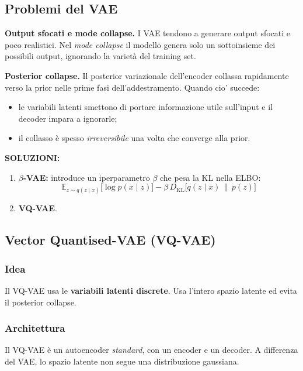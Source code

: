 \documentclass[11pt,a4paper]{article}
\providecommand{\E}{\mathbb{E}}
\providecommand{\DKL}{D_{\mathrm{KL}}}
\begin{document}
\subsection{Problemi del VAE}

\textbf{Output sfocati e mode collapse.} I VAE tendono a generare output sfocati e poco realistici. Nel 
\emph{mode collapse} il modello genera solo un sottoinsieme dei possibili output, 
ignorando la varietà del training set. 

\textbf{Posterior collapse.} Il posterior variazionale dell'encoder collassa rapidamente verso la prior nelle 
prime fasi dell'addestramento. Quando cio' succede:
\begin{itemize}
  \item le variabili latenti smettono di portare informazione utile sull'input e il decoder impara a ignorarle;
  \item il collasso è spesso \textit{irreversibile} una volta che converge alla prior.
\end{itemize}

\textbf{SOLUZIONI:}
\begin{enumerate}
  \item \textbf{$\beta$-VAE:} introduce un iperparametro $\beta$ che pesa la KL nella ELBO:
  \[
  \boxed{\E_{z \sim q(z \mid x)}\big[\log p(x \mid z)\big] - \beta\, \DKL\big[q(z \mid x) \,\|\, p(z)\big]}
  \]
  \item \textbf{VQ-VAE}.
\end{enumerate}

\subsection{Vector Quantised-VAE (VQ-VAE)}

\subsubsection{Idea}

Il VQ-VAE usa le \textbf{variabili latenti discrete}. 
Usa l'intero spazio latente ed evita il posterior collapse.

\subsubsection{Architettura}

Il VQ-VAE è un autoencoder \emph{standard}, con un encoder e un decoder. A differenza del VAE, lo spazio latente 
non segue una distribuzione gaussiana.
\end{document}

